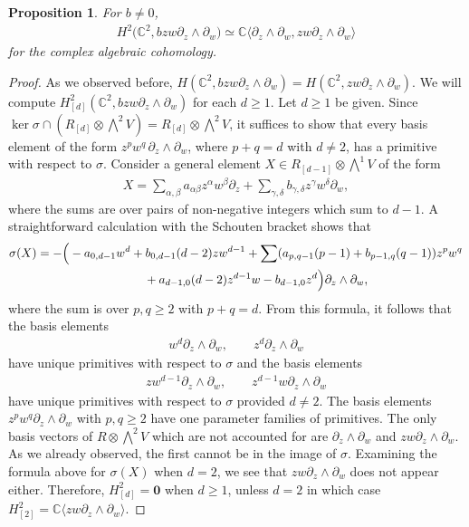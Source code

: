 \documentclass[10pt,a4paper]{amsart}
\numberwithin{equation}{section}
\newtheorem{Proposition}[Theorem]{Proposition}
 { \theoremstyle{definition}
\newtheorem{Definition}[Theorem]{Definition}
\newtheorem{Note}[Theorem]{Note}
\newtheorem{Example}[Theorem]{Example}
\newtheorem{Remark}[Theorem]{Remark} }
\begin{document}
\begin{Proposition}
For $b\not=0$,
\begin{gather*}
H^2\big({\mathbb C}^2,bzw\partial_z\wedge\partial_w\big)\simeq {\mathbb C}\langle \partial_z\wedge\partial_w,zw\partial_z\wedge\partial_w\rangle
\end{gather*}
for the complex algebraic cohomology.
\end{Proposition}
\begin{proof} As we observed before, $H({\mathbb C}^2,bzw\partial_z\wedge\partial_w)=H({\mathbb C}^2,zw\partial_z\wedge\partial_w)$. We will compute $H^2_{[d]}({\mathbb C}^2,bzw\partial_z\wedge\partial_w)$ for each $d\ge 1$. Let $d\ge 1$ be given. Since $\ker\sigma\cap (R_{[d]}\otimes \bigwedge^2 V)=R_{[d]}\otimes \bigwedge^2 V$, it suf\/f\/ices to show that every basis element of the form $z^pw^q\,\partial_z\wedge\partial_w$, where $p+q=d$ with $d\not=2$, has a primitive with respect to $\sigma$. Consider a general element $X\in R_{[d-1]}\otimes \bigwedge^1 V$ of the form
\begin{gather*}
X=\sum_{\alpha,\beta}a_{\alpha\beta}z^\alpha w^\beta\partial_z+\sum_{\gamma,\delta} b_{\gamma,\delta}z^\gamma w^\delta \partial_w,
\end{gather*}
where the sums are over pairs of non-negative integers which sum to $d-1$. A straightforward calculation with the Schouten bracket shows that
\begin{gather*}
\sigma(X) =  -\Big({}-a_{0,d-1}w^d+b_{0,d-1}(d-2)zw^{d-1}    +\sum (a_{p,q-1}(p-1)+b_{p-1,q}(q-1))z^pw^q   \\
 \hphantom{\sigma(X) =}{} +  a_{d-1,0}(d-2)z^{d-1}w-b_{d-1,0}z^d\Big)\partial_z\wedge\partial_w, %
\end{gather*}
where the sum is over $p,q\ge 2$ with $p+q=d$. From this formula, it follows that the basis elements
\begin{gather*}
w^d\partial_z\wedge\partial_w,\qquad z^d\partial_z\wedge\partial_w
\end{gather*}
have unique primitives with respect to $\sigma$ and the basis elements
\begin{gather*}
zw^{d-1}\partial_z\wedge\partial_w,\qquad z^{d-1}w\partial_z\wedge\partial_w
\end{gather*}
have unique primitives with respect to $\sigma$ provided $d\not= 2$. The basis elements $z^pw^q\partial_z\wedge\partial_w$ with $p,q\ge 2$ have one parameter families of primitives. The only basis vectors of $R\otimes \bigwedge^2 V$ which are not accounted for are $\partial_z\wedge\partial_w$ and $zw\partial_z\wedge\partial_w$. As we already observed, the f\/irst cannot be in the image of $\sigma$. Examining the formula above for $\sigma(X)$ when $d=2$, we see that $zw\partial_z\wedge\partial_w$ does not appear either. Therefore, $H_{[d]}^2=\mathbf 0$ when $d\ge 1$, unless $d=2$ in which case $H_{[2]}^2={\mathbb C}\langle zw\partial_z\wedge\partial_w\rangle$.
\end{proof}
\end{document}
